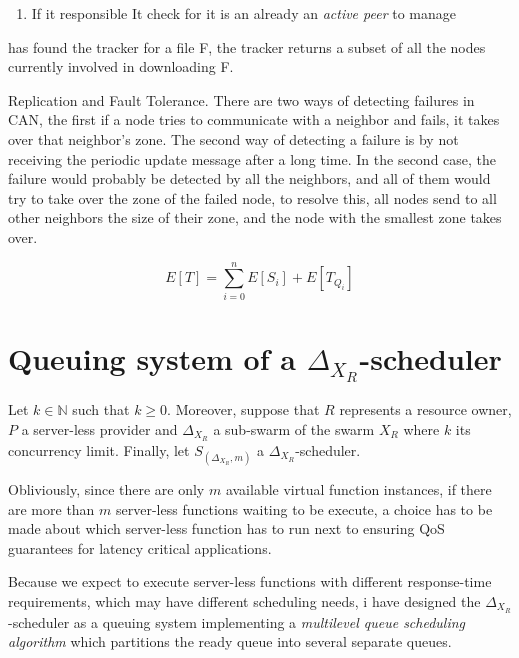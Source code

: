 \documentclass[10pt,a4paper]{article}
\theoremstyle{definition}
\begin{document}
\begin{enumerate}
\item If it responsible It check for it is an already an \textit{active peer} to manage 
\end{enumerate}




 has found the tracker for a file F, the tracker returns a subset
of all the nodes currently involved in downloading F.




Replication and Fault Tolerance. There are two ways of detecting failures in CAN,
the first if a node tries to communicate with a neighbor and fails, it takes over that neighbor’s
zone. The second way of detecting a failure is by not receiving the periodic update message
after a long time. In the second case, the failure would probably be detected by all the
neighbors, and all of them would try to take over the zone of the failed node, to resolve this,
all nodes send to all other neighbors the size of their zone, and the node with the smallest
zone takes over.

\newpage


\begin{equation}
E[T] = \sum_{i = 0}^n E[S_i] + E[T_{Q_i}]
\end{equation}

\section{Queuing system of a $\Delta_{X_{R}}$-scheduler}

Let $k \in \mathbb{N}$ such that $k \geq 0$. Moreover, suppose that $R$ represents a resource owner, $P$ a server-less provider and $\Delta_{X_{R}}$ a sub-swarm of the swarm $X_{R}$ where $k$ its concurrency limit. Finally, let $S_{(\Delta_{X_{R}},m)}$ a $\Delta_{X_{R}}$-scheduler. 

Obliviously, since there are only $m$ available virtual function instances, if there are more than $m$ server-less functions waiting to be execute, a choice has to be made about which server-less function has to run next to ensuring QoS guarantees for latency critical applications.

Because we expect to execute server-less functions with different response-time requirements, which may have different scheduling needs, i have designed the $\Delta_{X_{R}}$-scheduler as a queuing system implementing a \textit{multilevel queue scheduling algorithm} which partitions the ready queue into several separate queues. 
\end{document}
